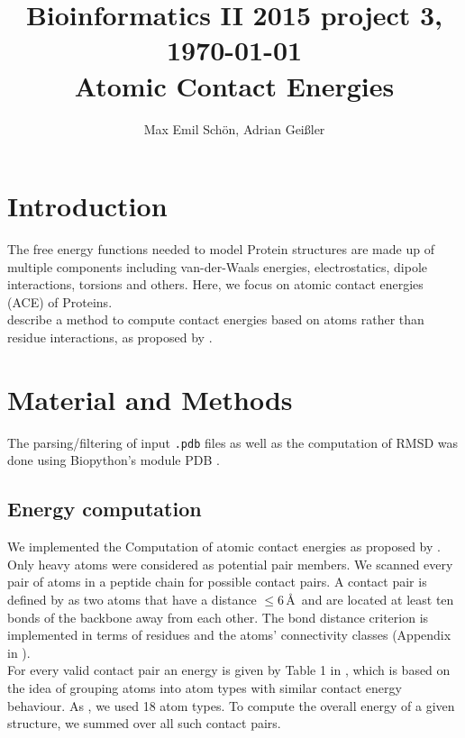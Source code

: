 \documentclass[11pt,a4paper]{article}
\renewcommand{\(}{\left (}
\renewcommand{\)}{\right )}
\begin{document}
\title{
  {\small Bioinformatics II 2015 \hfill project 3, \today}\\
   Atomic Contact Energies
}

\author{
Max Emil Schön, Adrian Geißler
}

\maketitle




\section{Introduction}
The free energy functions needed to model Protein structures are made up of multiple components including van-der-Waals energies, electrostatics, dipole interactions, torsions and others. Here, we focus on atomic contact energies (ACE) of Proteins.\\
\cite{Zhang1997} describe a method to compute contact energies based on atoms rather than residue interactions, as proposed by \citet{Miyazawa1996}. 
\section{Material and Methods}
The parsing/filtering of input \texttt{.pdb} files as well as the computation of RMSD was done using Biopython's module PDB \citep{pdb}.
\subsection{Energy computation}\label{energies}
We implemented the Computation of atomic contact energies as proposed by \citet{Zhang1997}. Only heavy atoms were considered as potential pair members. We scanned every pair of atoms in a peptide chain for possible contact pairs. A contact pair is defined by \citet{Zhang1997} as two atoms that have a distance $\leq 6$\,\AA\ and are located at least ten bonds of the backbone away from each other. The bond distance criterion is implemented in terms of residues and the atoms' connectivity classes (Appendix in \citet{Zhang1997}). \\
For every valid contact pair an energy is given by Table 1 in \citet{Zhang1997}, which is based on the idea of grouping atoms into atom types with similar contact energy behaviour. As \citet{Zhang1997}, we used 18 atom types. To compute the overall energy of a given structure, we summed over all such contact pairs.
\end{document}
